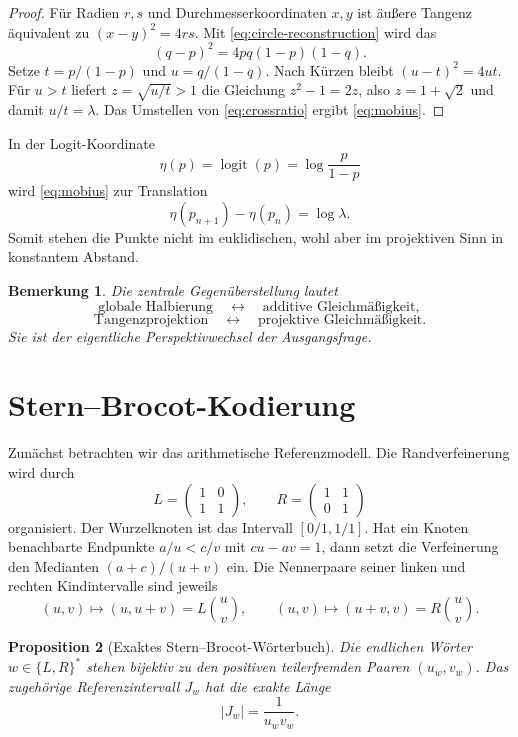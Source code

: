 \documentclass[11pt,a4paper]{article}
\newcommand{\Logit}{\operatorname{logit}}
\newtheorem{remark}{Bemerkung}[section]
\newtheorem{proposition}[remark]{Proposition}
\begin{document}
\begin{proof}
Für Radien $r,s$ und Durchmesserkoordinaten $x,y$ ist äußere Tangenz
äquivalent zu $(x-y)^2=4rs$. Mit \eqref{eq:circle-reconstruction} wird das
\[
 (q-p)^2=4pq(1-p)(1-q).
\]
Setze $t=p/(1-p)$ und $u=q/(1-q)$. Nach Kürzen bleibt
$(u-t)^2=4ut$. Für $u>t$ liefert $z=\sqrt{u/t}>1$ die Gleichung
$z^2-1=2z$, also $z=1+\sqrt2$ und damit $u/t=\lambda$. Das Umstellen von
\eqref{eq:crossratio} ergibt \eqref{eq:mobius}.
\end{proof}

In der Logit-Koordinate
\[
 \eta(p)=\Logit(p)=\log\frac{p}{1-p}
\]
wird \eqref{eq:mobius} zur Translation
\[
 \eta(p_{n+1})-\eta(p_n)=\log\lambda.
\]
Somit stehen die Punkte nicht im euklidischen, wohl aber im projektiven Sinn
in konstantem Abstand.

\begin{remark}
Die zentrale Gegenüberstellung lautet
\[
 \text{globale Halbierung}\quad\longleftrightarrow\quad
 \text{additive Gleichmäßigkeit},
\]
\[
 \text{Tangenzprojektion}\quad\longleftrightarrow\quad
 \text{projektive Gleichmäßigkeit}.
\]
Sie ist der eigentliche Perspektivwechsel der Ausgangsfrage.
\end{remark}

\section{Stern--Brocot-Kodierung}\label{sec:dictionary}

Zunächst betrachten wir das arithmetische Referenzmodell. Die
Randverfeinerung wird durch
\[
 L=\begin{pmatrix}1&0\\1&1\end{pmatrix},
 \qquad
 R=\begin{pmatrix}1&1\\0&1\end{pmatrix}
\]
organisiert. Der Wurzelknoten ist das Intervall $[0/1,1/1]$. Hat ein Knoten
benachbarte Endpunkte $a/u<c/v$ mit $cu-av=1$, dann setzt die Verfeinerung
den Medianten $(a+c)/(u+v)$ ein. Die Nennerpaare seiner linken und rechten
Kindintervalle sind jeweils
\[
 (u,v)\longmapsto (u,u+v)=L\binom{u}{v},
 \qquad
 (u,v)\longmapsto (u+v,v)=R\binom{u}{v}.
\]

\begin{proposition}[Exaktes Stern--Brocot-Wörterbuch]
Die endlichen Wörter $w\in\{L,R\}^*$ stehen bijektiv zu den positiven
teilerfremden Paaren $(u_w,v_w)$. Das zugehörige Referenzintervall $J_w$
hat die exakte Länge
\begin{equation}\label{eq:reference-length}
 |J_w|=\frac{1}{u_wv_w}.
\end{equation}
\end{proposition}
\end{document}
